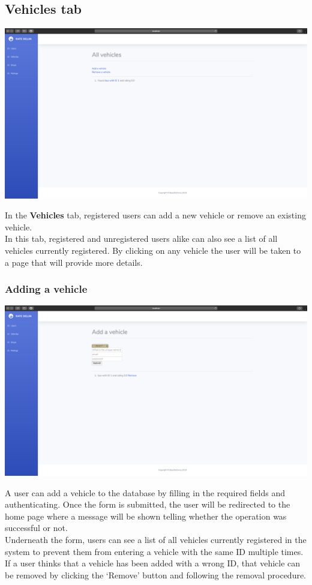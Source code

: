 \documentclass[12pt]{article}
\begin{document}
\subsection{Vehicles tab}
\begin{center}
	\includegraphics[width=\linewidth]{Images/Vehicles_tab.png}
\end{center}
In the \textbf{Vehicles} tab, registered users can add a new vehicle or remove an existing vehicle.\\
In this tab, registered and unregistered users alike can also see a list of all vehicles currently registered. By clicking on any vehicle the user will be taken to a page that will provide more details.

\subsubsection{Adding a vehicle}
\begin{center}
	\includegraphics[width=\linewidth]{Images/Add_vehicle.png}
\end{center}
A user can add a vehicle to the database by filling in the required fields and authenticating. Once the form is submitted, the user will be redirected to the home page where a message will be shown telling whether the operation was successful or not.\\
Underneath the form, users can see a list of all vehicles currently registered in the system to prevent them from entering a vehicle with the same ID multiple times.\\
If a user thinks that a vehicle has been added with a wrong ID, that vehicle can be removed by clicking the `Remove' button and following the removal procedure.
\end{document}

